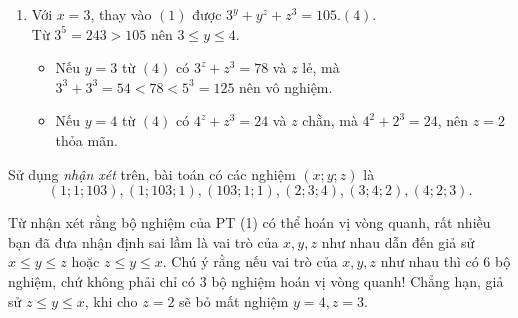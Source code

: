 \begin{bt}
{\begin{enumerate}
			\item	Với $x=3$, thay vào $(1)$ được $3^y+y^z+z^3=105$.\hfill$(4)$. \\
			Từ $3^5=243>105$ nên $3 \leq y \leq 4$. 
			\begin{itemize}
				\item  Nếu $y=3$ từ $(4)$ có $3^z+z^3=78$ và $z$ lẻ, mà $3^3+3^3=54<78<5^3=125$ nên vô nghiệm. 
			\end{itemize}
			\begin{itemize}
				\item Nếu $y=4$ từ $(4)$ có $4^z+z^3=24$ và $z$ chẵn, mà $4^2+2^3=24$, nên $z=2$ thỏa mãn.
			\end{itemize}
\end{enumerate} 
Sử dụng \textit{nhận xét} trên, bài toán có các nghiệm $(x; y; z)$ là 
$$(1; 1; 103), (1; 103; 1), (103; 1; 1), (2; 3; 4), (3; 4; 2), (4; 2; 3).$$	
\begin{nx}
	Từ nhận xét rằng bộ nghiệm của PT (1) có thể hoán vị vòng quanh, rất nhiều bạn đã đưa nhận định sai lầm là vai trò của $x, y, z$ như nhau dẫn đến giả sử $x \leq y \leq z$ hoặc $z \leq y \leq x$. Chú ý rằng nếu vai trò của $x, y, z$ như nhau thì có 6 bộ nghiệm, chứ không phải chỉ có 3 bộ nghiệm hoán vị vòng quanh! Chẳng hạn, giả sử $z \leq y \leq x$, khi cho $z=2$ sẽ bỏ mất nghiệm $y=4, z=3$. 
\end{nx}
	}
\end{bt}


